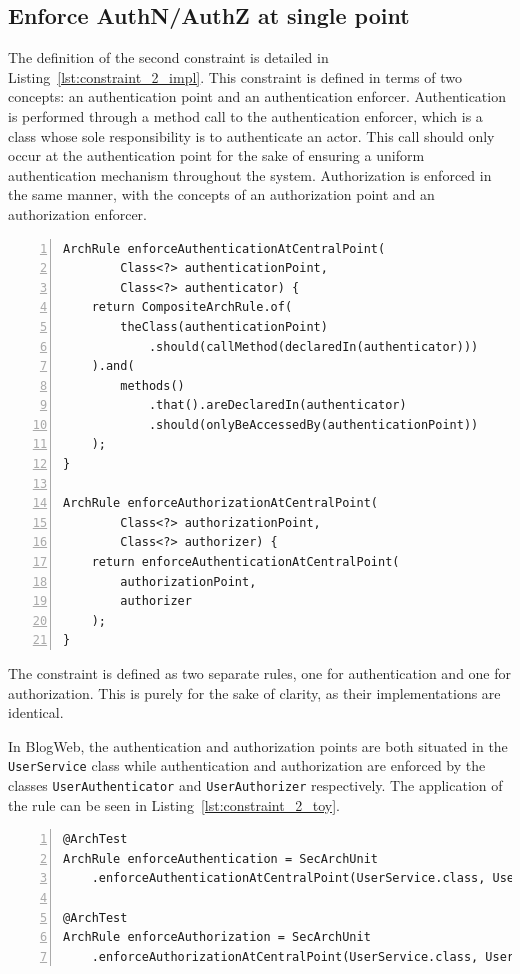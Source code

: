 \subsection{Enforce AuthN/AuthZ at single point}
The definition of the second constraint is detailed in Listing~\ref{lst:constraint_2_impl}.
This constraint is defined in terms of two concepts: an authentication point and an authentication enforcer. Authentication is performed through a method call to the authentication enforcer, which is a class whose sole responsibility is to authenticate an actor. This call should only occur at the authentication point for the sake of ensuring a uniform authentication mechanism throughout the system. Authorization is enforced in the same manner, with the concepts of an authorization point and an authorization enforcer.

\begin{minipage}{\linewidth}
\begin{lstlisting}[caption={Rule definitions for constraint 2.}, captionpos=b, label=lst:constraint_2_impl, numbers=left]
ArchRule enforceAuthenticationAtCentralPoint(
        Class<?> authenticationPoint,
        Class<?> authenticator) {
    return CompositeArchRule.of(
        theClass(authenticationPoint)
            .should(callMethod(declaredIn(authenticator)))
    ).and(
        methods()
            .that().areDeclaredIn(authenticator)
            .should(onlyBeAccessedBy(authenticationPoint))
    );
}

ArchRule enforceAuthorizationAtCentralPoint(
        Class<?> authorizationPoint,
        Class<?> authorizer) {
    return enforceAuthenticationAtCentralPoint(
        authorizationPoint,
        authorizer
    );
}
\end{lstlisting}
\end{minipage}

The constraint is defined as two separate rules, one for authentication and one for authorization. This is purely for the sake of clarity, as their implementations are identical.

In BlogWeb, the authentication and authorization points are both situated in the \texttt{UserService} class while authentication and authorization are enforced by the classes \texttt{UserAuthenticator} and \texttt{UserAuthorizer} respectively. The application of the rule can be seen in Listing~\ref{lst:constraint_2_toy}.

\begin{minipage}{\linewidth}
\begin{lstlisting}[caption={Application of constraint 2 to BlogWeb.}, captionpos=b, label=lst:constraint_2_toy, numbers=left]
@ArchTest
ArchRule enforceAuthentication = SecArchUnit
    .enforceAuthenticationAtCentralPoint(UserService.class, UserAuthenticator.class);

@ArchTest
ArchRule enforceAuthorization = SecArchUnit
    .enforceAuthorizationAtCentralPoint(UserService.class, UserAuthorizer.class);
\end{lstlisting}
\end{minipage}

